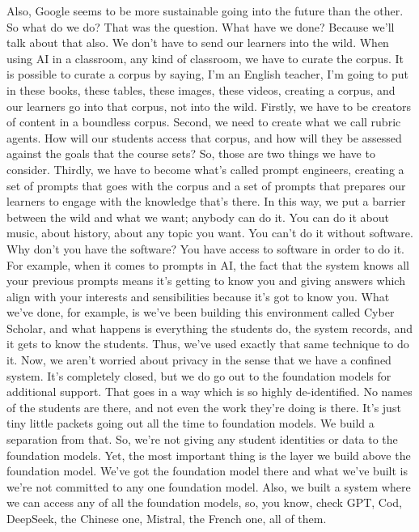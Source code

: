 \documentclass[english]{textolivre}
\begin{document}
{    Also, Google seems to be more sustainable going into the future than the other. So what do we do? That was the question. What have we done? Because we’ll talk about that also. We don’t have to send our learners into the wild. When using AI in a classroom, any kind of classroom, we have to curate the corpus. It is possible to curate a corpus by saying, I’m an English teacher, I’m going to put in these books, these tables, these images, these videos, creating a corpus, and our learners go into that corpus, not into the wild. Firstly, we have to be creators of content in a boundless corpus. Second, we need to create what we call rubric agents. How will our students access that corpus, and how will they be assessed against the goals that the course sets? So, those are two things we have to consider. Thirdly, we have to become what’s called prompt engineers, creating a set of prompts that goes with the corpus and a set of prompts that prepares our learners to engage with the knowledge that’s there. In this way, we put a barrier between the wild and what we want; anybody can do it. You can do it about music, about history, about any topic you want. You can’t do it without software. Why don’t you have the software? You have access to software in order to do it.\\
    For example, when it comes to prompts in AI, the fact that the system knows all your previous prompts means it’s getting to know you and giving answers which align with your interests and sensibilities because it’s got to know you. What we’ve done, for example, is we’ve been building this environment called Cyber Scholar, and what happens is everything the students do, the system records, and it gets to know the students. Thus, we’ve used exactly that same technique to do it. Now, we aren’t worried about privacy in the sense that we have a confined system. It’s completely closed, but we do go out to the foundation models for additional support. That goes in a way which is so highly de-identified. No names of the students are there, and not even the work they’re doing is there. It’s just tiny little packets going out all the time to foundation models. We build a separation from that. So, we’re not giving any student identities or data to the foundation models. Yet, the most important thing is the layer we build above the foundation model. We’ve got the foundation model there and what we’ve built is we’re not committed to any one foundation model. Also, we built a system where we can access any of all the foundation models, so, you know, check GPT, Cod, DeepSeek, the Chinese one, Mistral, the French one, all of them.\\
}
\end{document}
